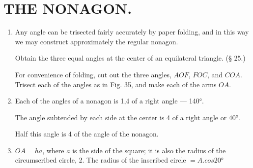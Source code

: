 
\chapter{THE NONAGON.}

\begin{enumerate}

\item Any angle can be trisected fairly accurately by paper folding, and in this
    way we may construct approximately the regular nonagon.

    
    Obtain the three equal angles at the center of an equilateral triangle. (§
    25.)

    For convenience of folding, cut out the three angles, $AOF$, $FOC$, and
    $COA$.  Trisect each of the angles as in Fig. 35, and make each of the arms 
    $OA$.


\item Each of the angles of a nonagon is 1,4 of a right angle — 140°.

    The angle subtended by each side at the center is 4 of a right angle or 40°.


    Half this angle is 4 of the angle of the nonagon.


\item $OA = ha$, where $a$ is the side of the square; it is also the radius of
    the circumscribed circle, 2.  The radius of the inscribed circle $= A . cos
    20°$


%
%
%
%
%
%
%
%
\end{enumerate}

